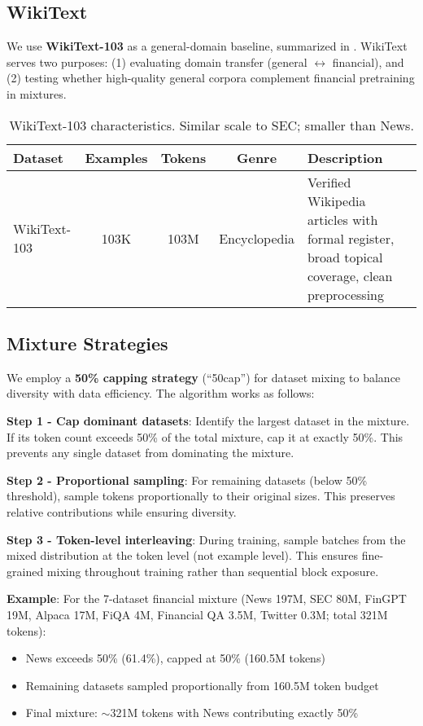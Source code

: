 \subsection{WikiText}

We use \textbf{WikiText-103} \parencite{merity2016pointer} as a general-domain baseline, summarized in . WikiText serves two purposes: (1) evaluating domain transfer (general $\leftrightarrow$ financial), and (2) testing whether high-quality general corpora complement financial pretraining in mixtures.

\begin{table}[h]
\centering
\caption[WikiText Dataset Characteristics]{WikiText-103 characteristics. Similar scale to SEC; smaller than News.}
\label{tab:wikitext_dataset}
\small
\begin{tabular}{p{3cm}cccp{5.5cm}}
\toprule
\textbf{Dataset} & \textbf{Examples} & \textbf{Tokens} & \textbf{Genre} & \textbf{Description} \\
\midrule
WikiText-103 & 103K & 103M & Encyclopedia & Verified Wikipedia articles with formal register, broad topical coverage, clean preprocessing \\
\bottomrule
\end{tabular}
\end{table}

\subsection{Mixture Strategies}

We employ a \textbf{50\% capping strategy} (``50cap'') for dataset mixing to balance diversity with data efficiency. The algorithm works as follows:

\textbf{Step 1 - Cap dominant datasets}: Identify the largest dataset in the mixture. If its token count exceeds 50\% of the total mixture, cap it at exactly 50\%. This prevents any single dataset from dominating the mixture.

\textbf{Step 2 - Proportional sampling}: For remaining datasets (below 50\% threshold), sample tokens proportionally to their original sizes. This preserves relative contributions while ensuring diversity.

\textbf{Step 3 - Token-level interleaving}: During training, sample batches from the mixed distribution at the token level (not example level). This ensures fine-grained mixing throughout training rather than sequential block exposure.

\textbf{Example}: For the 7-dataset financial mixture (News 197M, SEC 80M, FinGPT 19M, Alpaca 17M, FiQA 4M, Financial QA 3.5M, Twitter 0.3M; total 321M tokens):
\begin{itemize}
\item News exceeds 50\% (61.4\%), capped at 50\% (160.5M tokens)
\item Remaining datasets sampled proportionally from 160.5M token budget
\item Final mixture: $\sim$321M tokens with News contributing exactly 50\%
\end{itemize}


